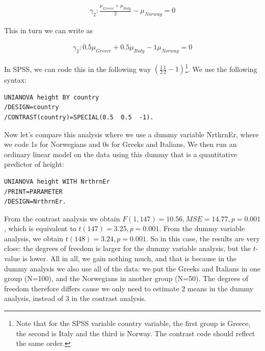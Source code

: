 \documentclass[]{report}\usepackage[]{graphicx}\usepackage[]{color}
\begin{document}
\begin{eqnarray}
\gamma_2 : \frac{\mu_{Greece} + \mu_{Italy}} {2} - \mu_{Norway}  = 0 
\end{eqnarray}


This in turn we can write as 

\begin{eqnarray}
\gamma_2 : 0.5 \mu_{Greece} + 0.5 \mu_{Italy} - 1 \mu_{Norway}  = 0 
\end{eqnarray}


In SPSS, we can code this in the following way $(\frac{1}{2} \frac{1}{2} -1)$\footnote{Note that for the SPSS variable country variable, the first group is Greece, the second is Italy and the third is Norway. The contrast code should reflect the same order.}. We use the following syntax:

\begin{verbatim}
UNIANOVA height BY country
/DESIGN=country
/CONTRAST(country)=SPECIAL(0.5  0.5  -1).
\end{verbatim}


Now let's compare this analysis where we use a dummy variable NrthrnEr, where we code 1s for Norwegians and 0s for Greeks and Italians. We then run an ordinary linear model on the data using this dummy that is a quantitative predictor of height:


\begin{verbatim}
UNIANOVA height WITH NrthrnEr
/PRINT=PARAMETER
/DESIGN=NrthrnEr.
\end{verbatim}

From the contrast analysis we obtain $F(1,147)=10.56, MSE=14.77, p=0.001$, which is equivalent to $t(147)=3.25, p=0.001$. From the dummy variable analysis, we obtain $t(148)= 3.24, p=0.001$. So in this case, the results are very close: the degrees of freedom is larger for the dummy variable analysis, but the $t$-value is lower. All in all, we gain nothing much, and that is because in the dummy analysis we also use all of the data: we put the Greeks and Italians in one group (N=100), and the Norwegians in another group (N=50). The degrees of freedom therefore differs cause we only need to estimate 2 means in the dummy analysis, instead of 3 in the contrast analysis.
\end{document}
